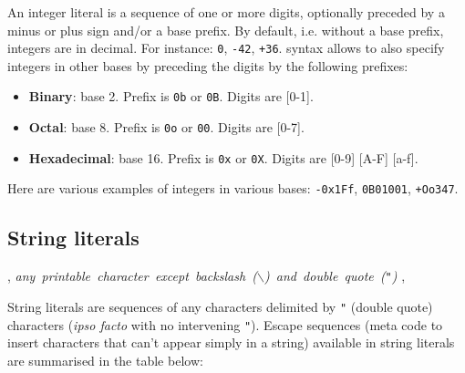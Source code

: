 An integer literal is a sequence of one or more digits, optionally
preceded by a minus or plus sign and/or a base prefix. By default,
i.e. without a base prefix, integers are in decimal. For instance:
{\tt 0}, {\tt -42}, {\tt +36}. {\focal} syntax allows to also specify
integers in other bases by preceding the digits by the following
prefixes:
\begin{itemize}
  \item {\bf Binary}: base 2. Prefix is {\tt 0b} or {\tt 0B}.
    Digits are [0-1].
  \item {\bf Octal}: base 8. Prefix is {\tt 0o} or {\tt 00}.
    Digits are [0-7].
  \item {\bf Hexadecimal}: base 16. Prefix is {\tt 0x} or {\tt 0X}.
    Digits are [0-9] [A-F] [a-f].
\end{itemize}
Here are various examples of integers in various bases:
{\tt -0x1Ff}, {\tt 0B01001}, {\tt +Oo347}.

\subsection{String literals}
\label{string literal}

\begin{syn}
 \is
\sep
{} \is \mbox{\em any printable character except backslash
  ($\backslash$) and double quote ({\tt"})}
\sep
{} \is
      \orelse {} \orelse {} \orelse {}
\alt \tok{\textvisiblespace} \orelse {} \orelse {} \orelse \tok{*}
     \orelse \tok{\backslash} \orelse {} \orelse \tok{-}
\alt \tok{(} \orelse \tok{)} \orelse \tok{[} \orelse \tok{]}
     \orelse \tok{\{} \orelse \tok{\}}
\alt {}  
\alt {} 
\end{syn}

String literals are sequences of any characters delimited by {\tt "}
(double quote) characters ({\em ipso facto} with no intervening
{\tt"}).
Escape sequences (meta code to insert characters that can't appear
simply in a string) available in string literals are summarised in the
table below:

